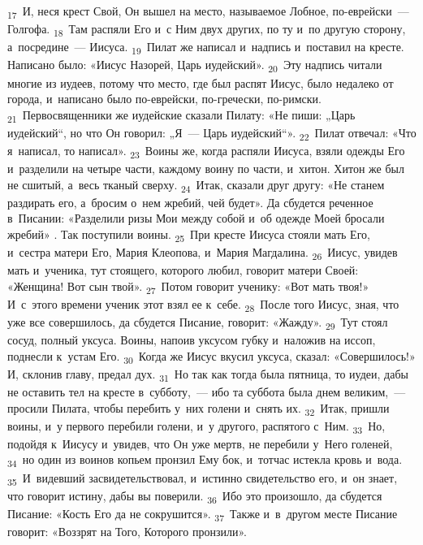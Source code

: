 \documentclass[a4paper,12pt]{article}
\begin{document}
\textsubscript{17}~И, неся крест Свой, Он вышел на место, называемое Лобное, по-еврейски~--- Голгофа. \textsubscript{18}~Там распяли Его и~с Ним двух других, по ту и~по другую сторону, а~посредине~--- Иисуса. \textsubscript{19}~Пилат же написал и~надпись и~поставил на кресте. Написано было: «Иисус Назорей, Царь иудейский». \textsubscript{20}~Эту надпись читали многие из иудеев, потому что место, где был распят Иисус, было недалеко от города, и~написано было по-еврейски, по-гречески, по-римски. \textsubscript{21}~Первосвященники же иудейские сказали Пилату: «Не пиши: „Царь иудейский“, но что Он говорил: „Я~--- Царь иудейский“». \textsubscript{22}~Пилат отвечал: «Что я~написал, то написал». \textsubscript{23}~Воины же, когда распяли Иисуса, взяли одежды Его и~разделили на четыре части, каждому воину по части, и~хитон. Хитон же был не сшитый, а~весь тканый сверху. \textsubscript{24}~Итак, сказали друг другу: «Не станем раздирать его, а~бросим о~нем жребий, чей будет». Да сбудется реченное в~Писании: «Разделили ризы Мои между собой и~об одежде Моей бросали жребий» . Так поступили воины. \textsubscript{25}~При кресте Иисуса стояли мать Его, и~сестра матери Его, Мария Клеопова, и~Мария Магдалина. \textsubscript{26}~Иисус, увидев мать и~ученика, тут стоящего, которого любил, говорит матери Своей: «Женщина! Вот сын твой». \textsubscript{27}~Потом говорит ученику: «Вот мать твоя!» И~с~этого времени ученик этот взял ее к~себе. \textsubscript{28}~После того Иисус, зная, что уже все совершилось, да сбудется Писание, говорит: «Жажду». \textsubscript{29}~Тут стоял сосуд, полный уксуса. Воины, напоив уксусом губку и~наложив на иссоп, поднесли к~устам Его. \textsubscript{30}~Когда же Иисус вкусил уксуса, сказал: «Совершилось!» И, склонив главу, предал дух. \textsubscript{31}~Но так как тогда была пятница, то иудеи, дабы не оставить тел на кресте в~субботу,~--- ибо та суббота была днем великим,~--- просили Пилата, чтобы перебить у~них голени и~снять их. \textsubscript{32}~Итак, пришли воины, и~у первого перебили голени, и~у другого, распятого с~Ним. \textsubscript{33}~Но, подойдя к~Иисусу и~увидев, что Он уже мертв, не перебили у~Него голеней, \textsubscript{34}~но один из воинов копьем пронзил Ему бок, и~тотчас истекла кровь и~вода. \textsubscript{35}~И~видевший засвидетельствовал, и~истинно свидетельство его, и~он знает, что говорит истину, дабы вы поверили. \textsubscript{36}~Ибо это произошло, да сбудется Писание: «Кость Его да не сокрушится». \textsubscript{37}~Также и~в~другом месте Писание говорит: «Воззрят на Того, Которого пронзили». 
\end{document}
